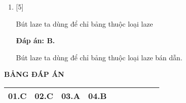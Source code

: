 \begin{enumerate}[label=\bfseries Câu \arabic*:]
{	}
	
	\item {} [5]
	
	\cauhoi
	{Bút laze ta dùng để chỉ bảng thuộc loại laze
	}
	
	\loigiai
	{		\textbf{Đáp án: B.}
		
		Bút laze ta dùng để chỉ bảng thuộc loại laze bán dẫn.
		
	}
	
\end{enumerate}

\loigiai
{
	\begin{center}
		\textbf{BẢNG ĐÁP ÁN}
	\end{center}
	\begin{center}
		\begin{tabular}{|m{2.8em}|m{2.8em}|m{2.8em}|m{2.8em}|m{2.8em}|m{2.8em}|m{2.8em}|m{2.8em}|m{2.8em}|m{2.8em}|}
			\hline
			01.C  & 02.C  & 03.A  & 04.B  &  &  & & & &  \\
			\hline
			
		\end{tabular}
	\end{center}
}

\whiteBGstarEnd
